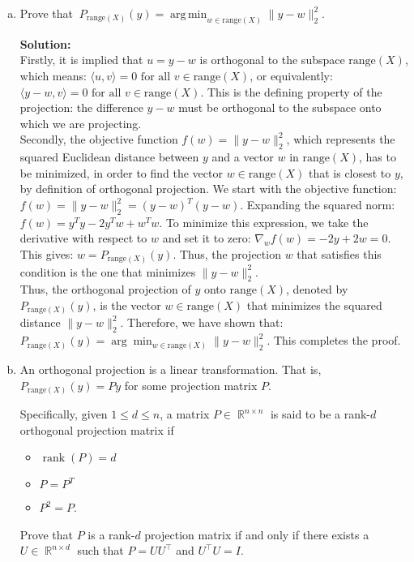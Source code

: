\documentclass{article}
\DeclareMathOperator{\rank}{\mathrm{rank}}
\DeclareMathOperator{\R}{\mathbb{R}}
\DeclareMathOperator*{\argmin}{arg\,min}
\newenvironment{solution}{\color{blue} \smallskip \textbf{Solution:}}{}
\begin{document}
\begin{enumerate}[(a)]

    \item Prove that $\displaystyle \ P_{\text{range}(X)}(y) = \argmin_{w \in \mathrm{range}(X)} \|y - w\|_2^2$.

    \begin{solution}\\
Firstly, it is implied that \( u = y - w \) is orthogonal to the subspace \(\text{range}(X)\), which means: \(\langle u, v \rangle = 0 \text{ for all } v \in \text{range}(X)\), or equivalently: \(\langle y - w, v \rangle = 0 \text{ for all } v \in \text{range}(X)\). This is the defining property of the projection: the difference \( y - w \) must be orthogonal to the subspace onto which we are projecting.\\

Secondly, the objective function \( f(w) = \|y - w\|_2^2 \), which represents the squared Euclidean distance between \( y \) and a vector \( w \) in \(\text{range}(X)\), has to be minimized, in order to find the vector \( w \in \text{range}(X) \) that is closest to \( y \), by definition of orthogonal projection. We start with the objective function: \( f(w) = \|y - w\|_2^2 = (y - w)^T (y - w) \). Expanding the squared norm: \( f(w) = y^T y - 2 y^T w + w^T w \). To minimize this expression, we take the derivative with respect to \( w \) and set it to zero: \( \nabla_w f(w) = -2 y + 2 w = 0 \). This gives: \( w = P_{\text{range}(X)}(y) \). Thus, the projection \( w \) that satisfies this condition is the one that minimizes \( \|y - w\|_2^2 \).\\

Thus, the orthogonal projection of \( y \) onto \(\text{range}(X)\), denoted by \( P_{\text{range}(X)}(y) \), is the vector \( w \in \text{range}(X) \) that minimizes the squared distance \( \|y - w\|_2^2 \). Therefore, we have shown that: \( P_{\text{range}(X)}(y) = \arg\min_{w \in \text{range}(X)} \|y - w\|_2^2 \). This completes the proof.



    \end{solution}

    \newpage
    \item An orthogonal projection is a linear transformation. That is, $P_{\text{range}(X)}(y) = Py$ for some projection matrix $P$. 
    
    Specifically, given $1 \le d \le n$, a matrix $P \in \R^{n \times n}$ is said to be a rank-$d$ orthogonal projection matrix if
    \begin{itemize}
        \item $\rank(P) = d$
        \item $P = P^{T}$
        \item $P^{2} = P$.
    \end{itemize}
    Prove that $P$ is a rank-$d$ projection matrix if and only if there exists a $U \in \R^{n \times d}$ such that $P = UU^\top$ and $U^{\top}U = I$.
    

\end{enumerate}
\end{document}
